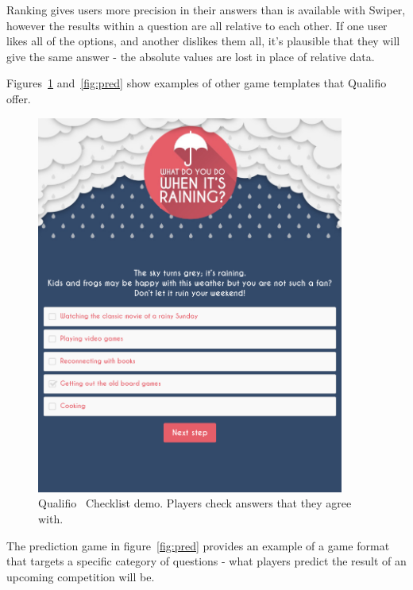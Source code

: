 Ranking gives users more precision in their answers than is available with Swiper, however the results within a question are all relative to each other. If one user likes all of the options, and another dislikes them all, it's plausible that they will give the same answer - the absolute values are lost in place of relative data.

Figures~\ref{fig:check} and~\ref{fig:pred} show examples of other game templates that Qualifio offer.

\begin{figure}[!h]
	\centering
	\includegraphics[width=0.9\textwidth]{./images/context/check.png}
	\caption{Qualifio~\cite{Qualifio} Checklist demo. Players check answers that they agree with.}
	\label{fig:check}
\end{figure}

The prediction game in figure~\ref{fig:pred} provides an example of a game format that targets a specific category of questions - what players predict the result of an upcoming competition will be.

